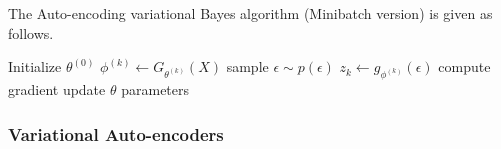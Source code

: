 The Auto-encoding variational Bayes algorithm (Minibatch version) is given as follows. 

















\begin{algorithm}
    \caption{Auto-encoding Variational Bayes}
    \begin{algorithmic}
        \State Initialize $\theta^{(0)}$
        \State $\phi^{(k)} \gets G_{\theta^{(k)}}(X)$
        \State sample $\epsilon \sim p(\epsilon)$
        \State $z_k \gets g_{\phi^{(k)}}(\epsilon)$
        \State compute gradient
        \State update $\theta$
        \EndFor
        \State \Return parameters
    \end{algorithmic}
\end{algorithm}

\subsubsection{Variational Auto-encoders}

